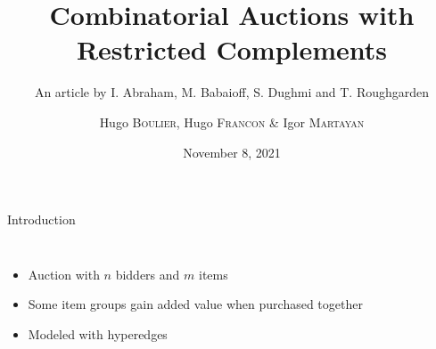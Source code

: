 \documentclass[aspectratio=169]{beamer}
\title{Combinatorial Auctions with Restricted Complements}
\subtitle{An article by I. Abraham, M. Babaioff, S. Dughmi and T. Roughgarden}
\author{Hugo \textsc{Boulier}, Hugo \textsc{Francon} \& Igor \textsc{Martayan}}
\date{November 8, 2021}
\begin{document}
{\maketitle}

\begin{frame}{Introduction}
    \begin{columns}
        \begin{itemize}
            \item Auction with $n$ bidders and $m$ items
            \item Some \alert{item groups} gain added value when purchased together
            \item Modeled with \alert{hyperedges}
        \end{itemize}


\end{columns}
\end{frame}
\end{document}
